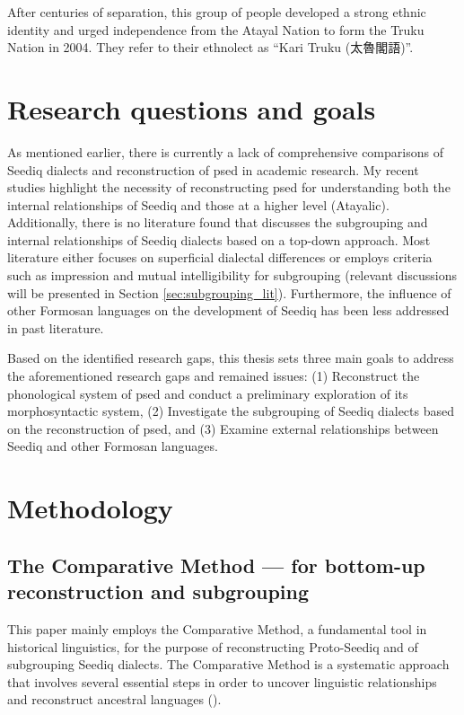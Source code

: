 After centuries of separation, this group of people developed a strong ethnic identity and urged independence from the Atayal Nation to form the Truku Nation in 2004. They refer to their ethnolect as ``Kari Truku (太魯閣語)''.

\section{Research questions and goals}

As mentioned earlier, there is currently a lack of comprehensive comparisons of Seediq dialects and reconstruction of \acl{psed} in academic research. My recent studies highlight the necessity of reconstructing \acl{psed} for understanding both the internal relationships of Seediq and those at a higher level (Atayalic). Additionally, there is no literature found that discusses the subgrouping and internal relationships of Seediq dialects based on a top-down approach. Most literature either focuses on superficial dialectal differences or employs criteria such as impression and mutual intelligibility for subgrouping (relevant discussions will be presented in Section \ref{sec:subgrouping_lit}). Furthermore, the influence of other Formosan languages on the development of Seediq has been less addressed in past literature.

Based on the identified research gaps, this thesis sets three main goals to address the aforementioned research gaps and remained issues: (1) Reconstruct the phonological system of \acl{psed} and conduct a preliminary exploration of its morphosyntactic system, (2) Investigate the subgrouping of Seediq dialects based on the reconstruction of \acl{psed}, and (3) Examine external relationships between Seediq and other Formosan languages.


\section{Methodology}\label{sec:methodology}

\subsection{The Comparative Method --- for bottom-up reconstruction and subgrouping}

This paper mainly employs the Comparative Method, a fundamental tool in historical linguistics, for the purpose of reconstructing Proto-Seediq and of subgrouping Seediq dialects. The Comparative Method is a systematic approach that involves several essential steps in order to uncover linguistic relationships and reconstruct ancestral languages (\cite{fox1995linguistic}).

